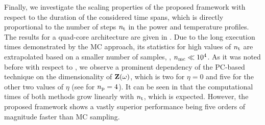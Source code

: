 Finally, we investigate the scaling properties of the proposed framework with respect to the duration of the considered time spans, which is directly proportional to the number of steps ${n_\text{t}}$ in the power and temperature profiles.
The results for a quad-core architecture are given in .
Due to the long execution times demonstrated by the MC approach, its statistics for high values of ${n_\text{t}}$ are extrapolated based on a smaller number of samples, \ie, ${n_\text{mc}} \ll 10^4$.
As it was noted before with respect to , we observe a prominent dependency of the PC-based technique on the dimensionality of $\mathbf{Z}(\omega)$, which is two for $\eta = 0$ and five for the other two values of $\eta$ (see  for ${n_\text{p}} = 4$).
It can be seen in  that the computational times of both methods grow linearly with ${n_\text{t}}$, which is expected.
However, the proposed framework shows a vastly superior performance being five orders of magnitude faster than MC sampling.
